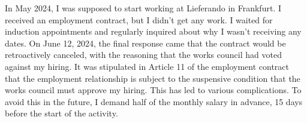 \versionLanguageStart%
		In May 2024, I was supposed to start working at Lieferando in Frankfurt.
		I received an employment contract, but I didn't get any work.
		I waited for induction appointments and regularly inquired about why I wasn't receiving any dates.
		On June 12, 2024, the final response came that the contract would be retroactively canceled, with the reasoning that the works council had voted against my hiring.
		It was stipulated in Article 11 of the employment contract that the employment relationship is subject to the suspensive condition that the works council must approve my hiring.
		This has led to various complications.
		To avoid this in the future, I demand half of the monthly salary in advance, 15 days before the start of the activity.
\versionLanguageEnd